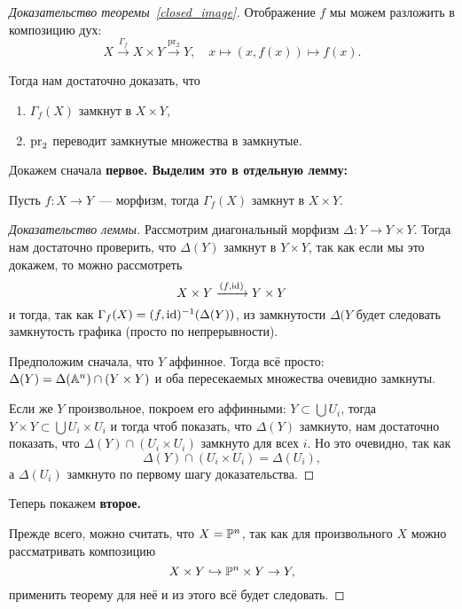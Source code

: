 	\begin{proof}[Доказательство теоремы~\ref{closed_image}]
		Отображение $f$ мы можем разложить в композицию дух: 
		\[
			X \xrightarrow{\Gamma_{f}} X \times Y \xrightarrow{\mathrm{pr_2}} Y, \quad x \mapsto (x, f(x)) \mapsto f(x).
		\]

		Тогда нам достаточно доказать, что 
		\begin{enumerate}
			\item $\Gamma_{f}(X)$ замкнут в $X \times Y$,
			\item $\pr_{2}$ переводит замкнутые множества в замкнутые. 
		\end{enumerate}

		Докажем сначала \bf{первое}. Выделим это в отдельную лемму:  

		\begin{lemma} 
			Пусть $f\colon X \to Y$~--- морфизм, тогда $\Gamma_{f}(X)$ замкнут в $X \times Y$.
		\end{lemma}
		\begin{proof}[Доказательство леммы]
			Рассмотрим диагональный морфизм $\Delta\colon Y \to Y \times Y$. Тогда нам достаточно проверить, что $\Delta(Y)$ замкнут в $Y \times Y$, так как если мы это докажем, то можно рассмотреть 
			\[
				X \times Y \xrightarrow{(f, \id)} Y \times Y
			\]
			и тогда, так как $\Gamma_{f}(X) = (f, \id)^{-1}(\Delta(Y))$, из замкнутости $\Delta(Y$ будет следовать замкнутость графика (просто по непрерывности). 

			Предположим сначала, что $Y$ аффинное. Тогда всё просто: $\Delta(Y) = \Delta(\AA^n) \cap (Y \times Y)$ и оба пересекаемых множества очевидно замкнуты. 

		 	Если же $Y$ произвольное, покроем его аффинными: $Y \subset \bigcup U_i$, тогда $Y \times Y \subset \bigcup U_i \times U_i$ и тогда чтоб показать, что $\Delta(Y)$ замкнуто, нам достаточно показать, что $\Delta(Y) \cap (U_i \times U_i)$ замкнуто для всех $i$. Но это очевидно, так как 
		 	\[
		 		\Delta(Y) \cap (U_i \times U_i) = \Delta(U_i),
		 	\]
		 	а $\Delta(U_i)$ замкнуто по первому шагу доказательства.  
		\end{proof}

		Теперь покажем \bf{второе}. 
		
		Прежде всего, можно считать, что $X = \PP^n$, так как для произвольного $X$ можно рассматривать композицию
		\[
			X \times Y \hookrightarrow \PP^n \times Y \to Y, 
		\]
		применить теорему для неё и из этого всё будет следовать. 


\end{proof}
